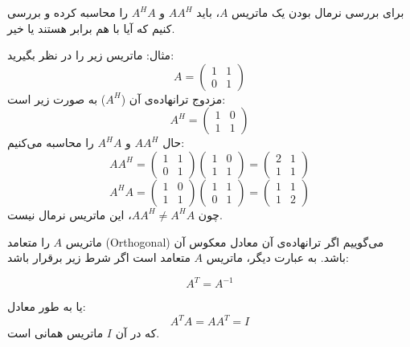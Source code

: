 \begin{example}
	

برای بررسی نرمال بودن یک ماتریس \( A \)، باید \( A A^H \) و \( A^H A \) را محاسبه کرده و بررسی کنیم که آیا با هم برابر هستند یا خیر.

مثال:
ماتریس زیر را در نظر بگیرید:
\[
A = \begin{pmatrix}
	1 & 1 \\
	0 & 1
\end{pmatrix}
\]
مزدوج ترانهاده‌ی آن (\( A^H \)) به صورت زیر است:
\[
A^H = \begin{pmatrix}
	1 & 0 \\
	1 & 1
\end{pmatrix}
\]
حال \( A A^H \) و \( A^H A \) را محاسبه می‌کنیم:
\[
A A^H = \begin{pmatrix}
	1 & 1 \\
	0 & 1
\end{pmatrix} \begin{pmatrix}
	1 & 0 \\
	1 & 1
\end{pmatrix} = \begin{pmatrix}
	2 & 1 \\
	1 & 1
\end{pmatrix}
\]
\[
A^H A = \begin{pmatrix}
	1 & 0 \\
	1 & 1
\end{pmatrix} \begin{pmatrix}
	1 & 1 \\
	0 & 1
\end{pmatrix} = \begin{pmatrix}
	1 & 1 \\
	1 & 2
\end{pmatrix}
\]
چون \( A A^H \neq A^H A \)، این ماتریس نرمال نیست.
\end{example}
\begin{definition}
	

ماتریس \( A \) را متعامد (Orthogonal) می‌گوییم اگر ترانهاده‌ی آن معادل  معکوس آن باشد. به عبارت دیگر، ماتریس \( A \) متعامد است اگر شرط زیر برقرار باشد:

\[
A^T = A^{-1}
\]

یا به طور معادل:
\[
A^T A = A A^T = I
\]
که در آن \( I \) ماتریس همانی است.

\end{definition}
